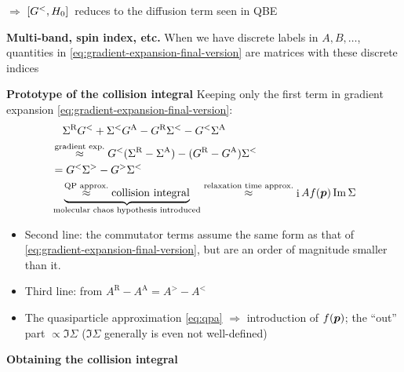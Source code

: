 \documentclass[t]{beamer}
\DeclareMathOperator{\ii}{i}
\begin{document}
\begin{frame}[allowframebreaks]
$\Rightarrow$ $\comm*{G^<}{H_0}$ reduces to the diffusion term seen in QBE

\vspace{0.25cm}

\textbf{Multi-band, spin index, etc.} When we have discrete labels in $A, B, \dots$,
quantities in \eqref{eq:gradient-expansion-final-version} 
are matrices with these discrete indices

\framebreak

\textbf{Prototype of the collision integral}
Keeping only the first term in gradient expansion \eqref{eq:gradient-expansion-final-version}:
\begin{equation}
    \begin{aligned}
        &\quad \Sigma^{\text{R}} G^< + \Sigma^< G^{\text{A}} - G^{\text{R}} \Sigma^< - G^< \Sigma^{\text{A}}\\
        &\stackrel{\text{gradient exp.}}{\approx} G^<(\Sigma^{\text{R}} - \Sigma^{\text{A}}) 
        - (G^{\text{R}} - G^{\text{A}}) \Sigma^< \\
        &= G^< \Sigma^> - G^> \Sigma^< \\
        &\underbrace{\stackrel{\text{QP approx.}}{\approx} \text{collision integral}}_{\text{molecular chaos hypothesis introduced}} \stackrel{\text{relaxation time approx.}}{\approx}  \ii A f (\vb*{p}) \Im \Sigma 
    \end{aligned}
\end{equation}    
\begin{itemize}
    \item Second line: the commutator terms assume  
    the same form as that of \eqref{eq:gradient-expansion-final-version},
    but are an order of magnitude smaller than it.
    \item Third line: from $A^{\text{R}} - A^{\text{A}} = A^> - A^<$
    \item The quasiparticle approximation \eqref{eq:qpa} $\Rightarrow$ introduction of $f(\vb*{p})$;
    the ``out'' part $\propto \Im \Sigma$
    ($\Im \Sigma$ generally is even not well-defined)
\end{itemize}

\framebreak

\textbf{Obtaining the collision integral} 


\end{frame}
\end{document}
